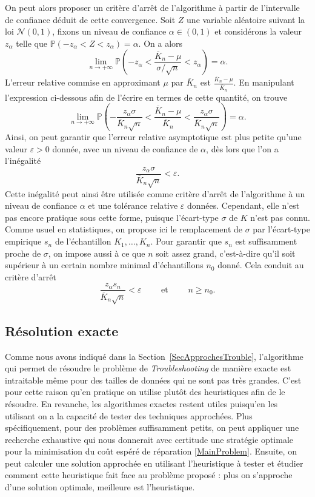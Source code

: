 \documentclass[a4paper,11pt]{article}
\theoremstyle{plain}
\theoremstyle{definition}
\begin{document}
On peut alors proposer un critère d'arrêt de l'algorithme à partir de l'intervalle de confiance déduit de cette convergence. Soit $Z$ une variable aléatoire suivant la loi $\mathcal N(0, 1)$, fixons un niveau de confiance $\alpha \in (0, 1)$ et considérons la valeur $z_\alpha$ telle que $\mathbb P(-z_\alpha < Z < z_\alpha) = \alpha$. On a alors
\[
\lim_{n \to +\infty} \mathbb P\left(-z_\alpha < \frac{\overline K_n - \mu}{\sigma / \sqrt{n}} < z_\alpha\right) = \alpha.
\]
L'erreur relative commise en approximant $\mu$ par $\overline K_n$ est $\frac{\overline K_n - \mu}{\overline K_n}$. En manipulant l'expression ci-dessous afin de l'écrire en termes de cette quantité, on trouve
\[
\lim_{n \to +\infty} \mathbb P\left(-\frac{z_\alpha \sigma}{\overline K_n \sqrt{n}} < \frac{\overline K_n - \mu}{\overline K_n} < \frac{z_\alpha \sigma}{\overline K_n \sqrt{n}}\right) = \alpha.
\]
Ainsi, on peut garantir que l'erreur relative asymptotique est plus petite qu'une valeur $\varepsilon > 0$ donnée, avec un niveau de confiance de $\alpha$, dès lors que l'on a l'inégalité
\[
\frac{z_\alpha \sigma}{\overline K_n \sqrt{n}} < \varepsilon.
\]
Cette inégalité peut ainsi être utilisée comme critère d'arrêt de l'algorithme à un niveau de con\-fiance $\alpha$ et une tolérance relative $\varepsilon$ données. Cependant, elle n'est pas encore pratique sous cette forme, puisque l'écart-type $\sigma$ de $K$ n'est pas connu. Comme usuel en statistiques, on propose ici le remplacement de $\sigma$ par l'écart-type empirique $s_n$ de l'échantillon $K_1, \dotsc, K_n$. Pour garantir que $s_n$ est suffisamment proche de $\sigma$, on impose aussi à ce que $n$ soit assez grand, c'est-à-dire qu'il soit supérieur à un certain nombre minimal d'échantillons $n_0$ donné. Cela conduit au critère d'arrêt
\begin{equation}
\label{EqCritereArret}
\frac{z_\alpha s_n}{\overline K_n \sqrt{n}} < \varepsilon \qquad \text{ et } \qquad n \geq n_0.
\end{equation}

\subsection{Résolution exacte}
\label{SecExacte}

Comme nous avons indiqué dans la Section~\ref{SecApprochesTrouble}, l'algorithme qui permet de résoudre le problème de \emph{Troubleshooting} de manière exacte est intraitable même pour des tailles de données qui ne sont pas très grandes. C'est pour cette raison qu'en pratique on utilise plutôt des heuristiques afin de le résoudre. En revanche, les algorithmes exactes restent utiles puisqu'en les utilisant on a la capacité de tester des techniques approchées. Plus spécifiquement, pour des problèmes suffisamment petits, on peut appliquer une recherche exhaustive qui nous donnerait avec certitude une stratégie optimale pour la minimisation du coût espéré de réparation \eqref{MainProblem}. Ensuite, on peut calculer une solution approchée en utilisant l'heuristique à tester et étudier comment cette heuristique fait face au problème proposé : plus on s'approche d'une solution optimale, meilleure est l'heuristique.
\end{document}
